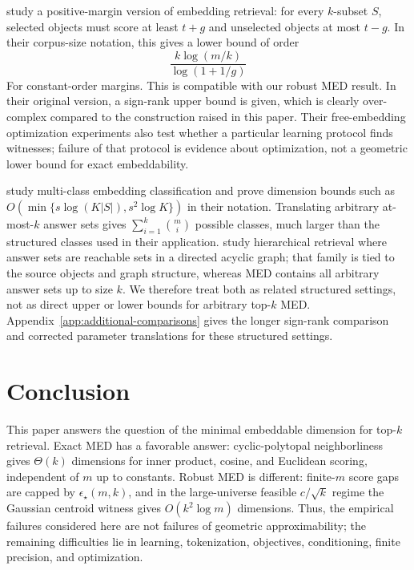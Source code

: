 \documentclass{article}
\begin{document}
\citet{weller2025theoretical} study a positive-margin version of embedding retrieval: for every $k$-subset $S$, selected objects must score at least $t+g$ and unselected objects at most $t-g$. In their corpus-size notation, this gives a lower bound of order
\[
    \frac{k\log(m/k)}{\log(1+1/g)}
\]
For constant-order margins. This is compatible with our robust MED result. In their original version, a sign-rank upper bound is given, which is clearly over-complex compared to the construction raised in this paper. Their free-embedding optimization experiments also test whether a particular learning protocol finds witnesses; failure of that protocol is evidence about optimization, not a geometric lower bound for exact embeddability.

\citet{guo2019breaking} study multi-class embedding classification and prove dimension bounds such as $O(\min\{s\log(K|S|),s^2\log K\})$ in their notation. Translating arbitrary at-most-$k$ answer sets gives $\sum_{i=1}^k\binom{m}{i}$ possible classes, much larger than the structured classes used in their application. \citet{you2025hierarchical} study hierarchical retrieval where answer sets are reachable sets in a directed acyclic graph; that family is tied to the source objects and graph structure, whereas MED contains all arbitrary answer sets up to size $k$. We therefore treat both as related structured settings, not as direct upper or lower bounds for arbitrary top-$k$ MED. Appendix~\ref{app:additional-comparisons} gives the longer sign-rank comparison and corrected parameter translations for these structured settings.
\section{Conclusion}\label{sec:conclusion}

This paper answers the question of the minimal embeddable dimension for top-$k$ retrieval. Exact MED has a favorable answer: cyclic-polytopal neighborliness gives $\Theta(k)$ dimensions for inner product, cosine, and Euclidean scoring, independent of $m$ up to constants. Robust MED is different: finite-$m$ score gaps are capped by $\epsilon_\star(m,k)$, and in the large-universe feasible $c/\sqrt{k}$ regime the Gaussian centroid witness gives $O(k^2\log m)$ dimensions. Thus, the empirical failures considered here are not failures of geometric approximability; the remaining difficulties lie in learning, tokenization, objectives, conditioning, finite precision, and optimization.
\end{document}
